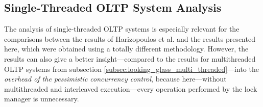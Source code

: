 \subsection{Single-Threaded OLTP System Analysis} \label{subsec:looking_glass_single_threaded}

    The analysis of single-threaded OLTP systems is especially relevant for the comparisons between the results of Harizopoulos et al. and the results presented here, which were obtained using a totally different methodology. However, the results can also give a better insight---compared to the results for multithreaded OLTP systems from subsection \ref{subsec:looking_glass_multi_threaded}---into the \emph{overhead of the pessimistic concurrency control}, because here---without multithreaded and interleaved execution---every operation performed by the lock manager is unnecessary.

